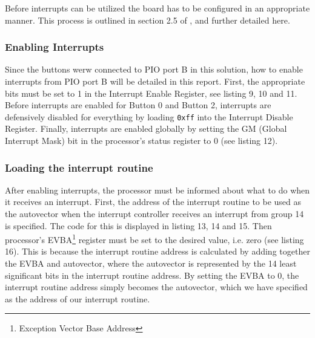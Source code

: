 Before interrupts can be utilized the board has to be configured in an appropriate manner. This process is outlined in section 2.5 of \cite{lab-compendium}, and further detailed here.
\subsubsection{Enabling Interrupts}
Since the buttons werw connected to PIO port B in this solution, how to enable interrupts from PIO port B will be detailed in this report.
First, the appropriate bits must be set to 1 in the Interrupt Enable Register, see listing 9, 10 and 11.
Before interrupts are enabled for Button 0 and Button 2, interrupts are defensively disabled for everything by loading \texttt{0xff} into the Interrupt Disable Register.
Finally, interrupts are enabled globally by setting the GM (Global Interrupt Mask) bit in the processor's status register to 0 (see listing 12). %
\subsubsection{Loading the interrupt routine}
After enabling interrupts, the processor must be informed about what to do when it receives an interrupt.
First, the address of the interrupt routine to be used as the autovector when the interrupt controller receives an interrupt from group 14 is specified.
The code for this is displayed in listing 13, 14 and 15.
Then processor's EVBA\footnote{Exception Vector Base Address} register must be set to the desired value, i.e. zero (see listing 16).
This is because the interrupt routine address is calculated by adding together the EVBA and autovector, where the autovector is represented by the 14 least significant bits in the interrupt routine address.
By setting the EVBA to 0, the interrupt routine address simply becomes the autovector, which we have specified as the address of our interrupt routine.
